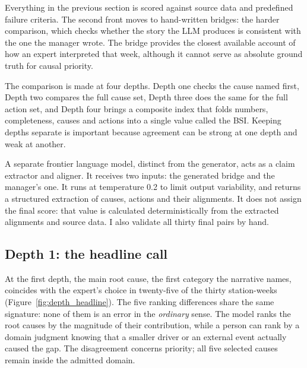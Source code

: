 \documentclass[12pt,a4paper,openright,twoside]{book}
\begin{document}
Everything in the previous section is scored against source data and predefined failure criteria. 
The second front moves to hand-written bridges: the harder comparison, which checks whether the story the \ac{LLM} produces is consistent with the one the manager wrote.
The bridge provides the closest available account of how an expert interpreted that week, although it cannot serve as absolute ground truth for causal priority.


The comparison is made at four depths. Depth one checks the cause named first, Depth two compares the full cause set, Depth three does the same for the full action set, and Depth four brings a composite index that folds numbers, completeness, causes and actions into a single value called the \ac{BSI}.
Keeping depths separate is important because agreement can be strong at one depth and weak at another.


A separate frontier language model, distinct from the generator, acts as a claim extractor and aligner.
It receives two inputs: the generated bridge and the manager's one. 
It runs at temperature 0.2 to limit output variability, and returns a structured extraction of causes, actions and their alignments.
It does not assign the final score: that value is calculated deterministically from the extracted alignments and source data. 
I also validate all thirty final pairs by hand.

\subsection{Depth 1: the headline call}
\label{sec:depth_headline}

At the first depth, the main root cause, the first category the narrative names, coincides with the expert's choice in twenty-five of the thirty station-weeks (Figure~\ref{fig:depth_headline}).
The five ranking differences share the same signature: none of them is an error in the \emph{ordinary} sense. 
The model ranks the root causes by the magnitude of their contribution, while a person can rank by a domain judgment knowing that a smaller driver or an external event actually caused the gap.
The disagreement concerns priority; all five selected causes remain inside the admitted domain.
\end{document}
